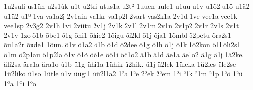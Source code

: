 {1u2suli
us1^^fch
u2s1^^fck
u1t
u2tri
utus1a
u2t^^b2
1uuen
uule1
u1uu
u1v
u1^^f52
u1^^f6
u1^^e42
u1^^fc2
u1^^ba
1va
va1a2j
2v1ain
va1kr
va1p2l
2vart
vas2k1a
2v1d
1ve
vee1a
vee1k
vee1sp
2v3g2
2v1h
1vi
2viitu
2v1j
2v1k
2v1l
2v1m
2v1n
2v1p2
2v1r
2v1s
2v1t
2v1v
1zo
^^f51b
^^f5be1
^^f51g
^^f5hi1
^^f5hie2
1^^f5igu
^^f5i2kl
^^f51j
^^f5ja1
1^^f5mbl
^^f52petu
^^f5ra2s1
^^f5u1a2r
^^f5ude1
1^^f5un.
^^f51v
^^f61a2
^^f61b
^^f61d
^^f62dee
^^f61g
^^f61h
^^f61j
^^f61k
1^^f62kon
^^f61l
^^f6li2s1
^^f61m
^^f62p1au
^^f61p2la
^^f61v
^^f61^^f5
^^f6^^f61e
^^f6^^f61i
^^f6^^f61o2
^^e41b
^^e41d
^^e4e1a
^^e4e1o2
^^e41g
^^e41j
1^^e42ke.
^^e4li2sa
^^e4ra1a
^^e4ra1o
^^fc1b
^^fc1g
^^fchi1a
1^^fchik
^^fc2hik.
^^fc1j
^^fc2lek
1^^fcleka
1^^fc2les
^^fcle2se
1^^fc2liko
^^fc1so
1^^fctle
^^fc1v
^^fc^^fcgi1
^^fc^^fc2l1a2
1^^b2a
1^^b2e
2^^b2ek
2^^b2em
1^^b2i
^^b21k
^^b21m
^^b21p
1^^b2^^f6
1^^b2^^fc
1^^baa
1^^bai
1^^bao
}%
